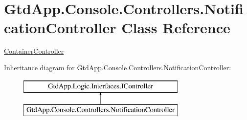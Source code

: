 \hypertarget{class_gtd_app_1_1_console_1_1_controllers_1_1_notification_controller}{}\section{Gtd\+App.\+Console.\+Controllers.\+Notification\+Controller Class Reference}
\label{class_gtd_app_1_1_console_1_1_controllers_1_1_notification_controller}


\mbox{\hyperlink{class_gtd_app_1_1_console_1_1_controllers_1_1_container_controller}{Container\+Controller}}  


Inheritance diagram for Gtd\+App.\+Console.\+Controllers.\+Notification\+Controller\+:\begin{figure}[H]
\begin{center}
\leavevmode
\includegraphics[height=2.000000cm]{class_gtd_app_1_1_console_1_1_controllers_1_1_notification_controller}
\end{center}
\end{figure}
